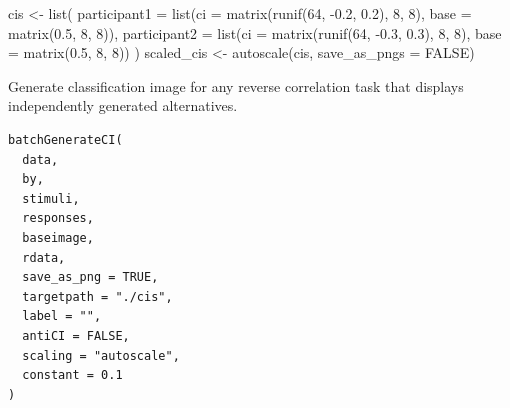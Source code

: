 \documentclass[letterpaper]{book}
\begin{document}
%
\begin{Examples}
\begin{ExampleCode}
cis <- list(
  participant1 = list(ci = matrix(runif(64, -0.2, 0.2), 8, 8), base = matrix(0.5, 8, 8)),
  participant2 = list(ci = matrix(runif(64, -0.3, 0.3), 8, 8), base = matrix(0.5, 8, 8))
)
scaled_cis <- autoscale(cis, save_as_pngs = FALSE)
\end{ExampleCode}
\end{Examples}
%
\begin{Description}
Generate classification image for any reverse correlation task that displays independently generated alternatives.
\end{Description}
%
\begin{Usage}
\begin{verbatim}
batchGenerateCI(
  data,
  by,
  stimuli,
  responses,
  baseimage,
  rdata,
  save_as_png = TRUE,
  targetpath = "./cis",
  label = "",
  antiCI = FALSE,
  scaling = "autoscale",
  constant = 0.1
)
\end{verbatim}
\end{Usage}
%
\end{document}
